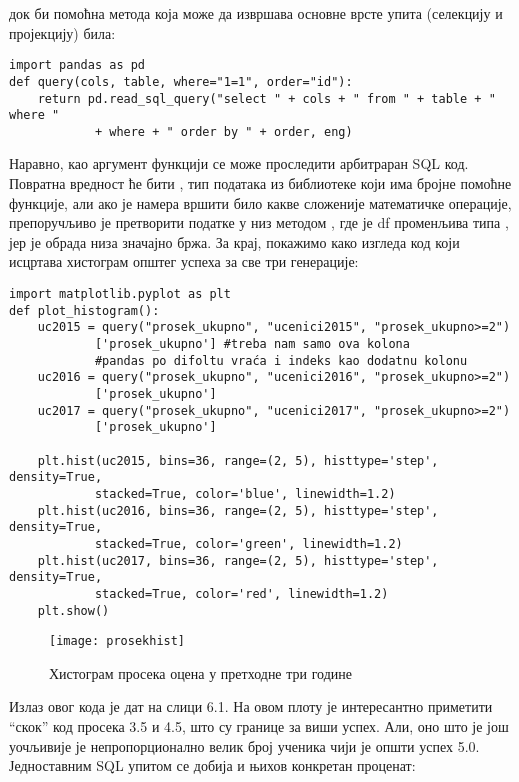 док би помоћна метода која може да извршава основне врсте упита (селекцију и пројекцију) била:

\begin{verbatim}
import pandas as pd
def query(cols, table, where="1=1", order="id"):
    return pd.read_sql_query("select " + cols + " from " + table + " where " 
            + where + " order by " + order, eng)
\end{verbatim}

Наравно, као аргумент  функцији се може проследити арбитраран SQL код. Повратна вредност ће бити , тип података из  библиотеке који има бројне помоћне функције, али ако је намера вршити било какве сложеније математичке операције, препоручљиво је претворити податке у  низ методом , где је df променљива типа , јер је обрада низа значајно бржа. За крај, покажимо како изгледа код који исцртава хистограм општег успеха за све три генерације:

\begin{verbatim}
import matplotlib.pyplot as plt
def plot_histogram():
    uc2015 = query("prosek_ukupno", "ucenici2015", "prosek_ukupno>=2")
            ['prosek_ukupno'] #treba nam samo ova kolona
            #pandas po difoltu vraća i indeks kao dodatnu kolonu
    uc2016 = query("prosek_ukupno", "ucenici2016", "prosek_ukupno>=2")
            ['prosek_ukupno']
    uc2017 = query("prosek_ukupno", "ucenici2017", "prosek_ukupno>=2")
            ['prosek_ukupno']

    plt.hist(uc2015, bins=36, range=(2, 5), histtype='step', density=True, 
            stacked=True, color='blue', linewidth=1.2)
    plt.hist(uc2016, bins=36, range=(2, 5), histtype='step', density=True, 
            stacked=True, color='green', linewidth=1.2)
    plt.hist(uc2017, bins=36, range=(2, 5), histtype='step', density=True, 
            stacked=True, color='red', linewidth=1.2)
    plt.show()
\end{verbatim}


\begin{figure}[h]
	\caption{Хистограм просека оцена у претходне три године}
	\centering
	\texttt{[image: prosekhist]}
\end{figure}


Излаз овог кода је дат на слици 6.1. На овом плоту је интересантно приметити \enquote{скок} код просека 3.5 и 4.5, што су границе за виши успех. Али, оно што је још уочљивије је непропорционално велик број ученика чији је општи успех 5.0. Једноставним SQL упитом се добија и њихов конкретан проценат:

